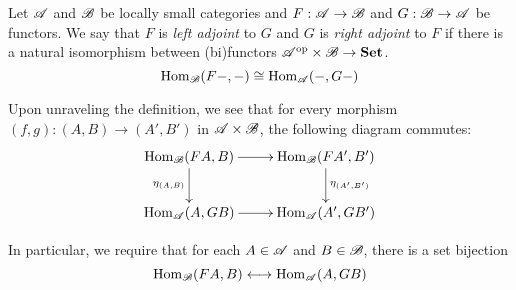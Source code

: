 \begin{definition}
    Let $\mathscr{A}$ and $\mathscr{B}$ be locally small categories and $F: \mathscr{A}\to\mathscr{B}$ and $G:\mathscr{B}\to\mathscr{A}$ be functors. We say that $F$ is \textit{left adjoint} to $G$ and $G$ is \textit{right adjoint} to $F$ if there is a natural isomorphism between (bi)functors $\mathscr{A}^{\text{op}}\times\mathscr{B}\to\mathbf{Set}$.
    \begin{equation*}
        \operatorname{Hom}_{\mathscr{B}}(F-,-)\cong\operatorname{Hom}_{\mathscr{A}}(-,G-)
    \end{equation*}
\end{definition}

Upon unraveling the definition, we see that for every morphism $(f,g): (A,B)\to(A',B')$ in $\mathscr{A}\times\mathscr{B}$, the following diagram commutes: 
\begin{equation*}
    \xymatrix{
    \Hom_{\B}(FA,B)\ar[r]\ar[d]_{\eta_{(A,B)}} & \Hom_{\B}(FA',B')\ar[d]^{\eta_{(A',B')}}\\
    \Hom_{\A}(A,GB)\ar[r] & \Hom_{\A}(A',GB')\\
    }
\end{equation*}

In particular, we require that for each $A\in\mathscr{A}$ and $B\in\mathscr{B}$, there is a set bijection 
\begin{equation*}
    \operatorname{Hom}_{\mathscr{B}}(FA,B)\longleftrightarrow\operatorname{Hom}_{\mathscr{A}}(A,GB)
\end{equation*}